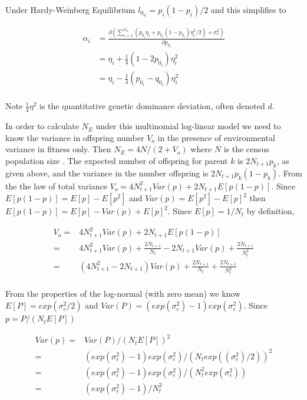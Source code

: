 \documentclass[12pt]{article}
\begin{document}
\begin{bibunit}
Under Hardy-Weinberg Equilibrium $l_{0_{ii}}=p_i(1 - p_i)/2$ and this simplifies to 

\begin{equation}
\begin{array}{rl}
\alpha_i&=\frac{\partial \left(\sum_{i=1}^{n_L}(p_{0_i} \eta_i+p_{0_i}(1-p_{0_i})\eta^2_{i}/2) + \sigma^2_e\right)}{\partial p_{0_i}}\\
&= \eta_i + \frac{1}{4}(1 - 2p_{0_i} )\eta^2_{i}\\
&= \eta_i - \frac{1}{4}(p_{0_i}-q_{0_i})\eta^2_{i}\\
\end{array} 
\end{equation}

Note $\frac{1}{4}\eta^2$ is the quantitative genetic dominance deviation, often denoted $d$.

In order to calculate $N_E$ under this multinomial log-linear model we need to know the variance in offspring number $V_o$ in the presence of environmental variance in fitness only.  Then $N_E=4N/(2+V_o)$ where $N$ is the census population size \citep{Wright.1938}. The expected number of offspring for parent $k$ is $2N_{t+1}p_k$, as given above, and  the variance in the number offspring is $2N_{t+1}p_k(1-p_k)$. From the the law of total variance $V_o = 4N^2_{t+1}Var(p)+2N_{t+1}E[p(1-p)]$.  Since $E[p(1-p)]=E[p]-E[p^2]$ and $Var(p)=E[p^2]-E[p]^2$ then $E[p(1-p)]=E[p]-Var(p)+E[p]^2$. Since $E[p] = 1/N_{t}$ by definition, 


\begin{equation}
\begin{array}{rl}
V_o =& 4N^2_{t+1}Var(p)+2N_{t+1}E[p(1-p)]\\
       =& 4N^2_{t+1}Var(p)+\frac{2N_{t+1}}{N_t}-2N_{t+1}Var(p)+\frac{2N_{t+1}}{N^2_t}\\
       =& (4N^2_{t+1}-2N_{t+1})Var(p)+\frac{2N_{t+1}}{N_t}+\frac{2N_{t+1}}{N^2_t}\\
\end{array}
\label{Eq:vo}
\end{equation}

From the properties of the log-normal (with zero mean) we know $E[P] = exp(\sigma_e^2/2)$ and $Var(P) = (exp(\sigma_e^2)-1)exp(\sigma_e^2)$. Since $p = P/(N_tE[P])$

\begin{equation}
\begin{array}{rl}
Var(p) =& Var(P)/(N_tE[P])^2\\
=&(exp(\sigma_e^2)-1)exp(\sigma_e^2)/(N_texp((\sigma_e^2)/2))^2\\
       =& (exp(\sigma_e^2)-1)exp(\sigma_e^2)/(N_t^2exp(\sigma_e^2))\\
       =& (exp(\sigma_e^2)-1)/N_t^2\\
\end{array}
\end{equation}


\end{bibunit}
\end{document}
